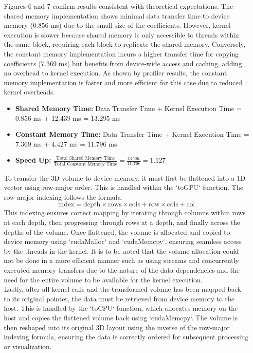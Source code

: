 \documentclass[journal,11pt]{IEEEtran}
\begin{document}
Figures 6 and 7 confirm results consistent with theoretical expectations. The shared memory implementation shows minimal data transfer time to device memory (0.856 ms) due to the small size of the coefficients. However, kernel execution is slower because shared memory is only accessible to threads within the same block, requiring each block to replicate the shared memory. Conversely, the constant memory implementation incurs a higher transfer time for copying coefficients (7.369 ms) but benefits from device-wide access and caching, adding no overhead to kernel execution. As shown by profiler results, the constant memory implementation is faster and more efficient for this case due to reduced kernel overheads.

\begin{itemize}
    \item \textbf{Shared Memory Time:} Data Transfer Time + Kernel Execution Time = 0.856 ms + 12.439 ms = 13.295 ms
    \item \textbf{Constant Memory Time:} Data Transfer Time + Kernel Execution Time = 7.369 ms + 4.427 ms = 11.796 ms
    \item \textbf{Speed Up:} $\frac{\text{Total Shared Memory Time}}{\text{Total Constant Memory Time}} = \frac{13.295}{11.796} = 1.127$
\end{itemize}

To transfer the 3D volume to device memory, it must first be flattened into a 1D vector using row-major order. This is handled within the `toGPU` function. The row-major indexing follows the formula:  
\begin{equation}
    \text{index} = \text{depth} \times \text{rows} \times \text{cols} + \text{row} \times \text{cols} + \text{col}
\end{equation}  
This indexing ensures correct mapping by iterating through columns within rows at each depth, then progressing through rows at a depth, and finally across the depths of the volume. Once flattened, the volume is allocated and copied to device memory using `cudaMalloc` and `cudaMemcpy`, ensuring seamless access by the threads in the kernel. It is to be noted that the volume allocation could not be done in a more efficient manner such as using streams and concurrently executed memory transfers due to the nature of the data dependencies and the need for the entire volume to be available for the kernel execution.\\

Lastly, after all kernel calls and the transformed volume has been mapped back to its original pointer, the data must be retrieved from device memory to the host. This is handled by the `toCPU` function, which allocates memory on the host and copies the flattened volume back using `cudaMemcpy`. The volume is then reshaped into its original 3D layout using the inverse of the row-major indexing formula, ensuring the data is correctly ordered for subsequent processing or visualization.
\end{document}

